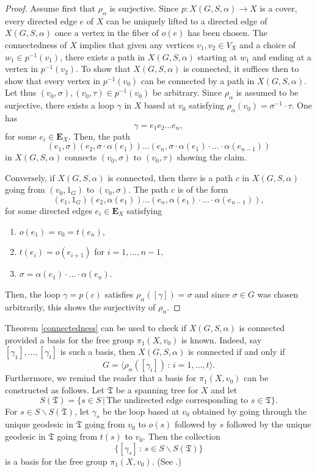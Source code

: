 \documentclass[11pt]{amsart}
\numberwithin{equation}{section}
\theoremstyle{remark}
\begin{document}
\begin{proof}
Assume first that $\rho_{\alpha}$ is surjective.  Since $p:X(G,S,\alpha) \rightarrow X$ is a cover, every directed edge $e$ of $X$ can be uniquely lifted to a directed edge of $X(G,S,\alpha)$ once a vertex in the fiber of $o(e)$ has been chosen.  The connectedness of $X$ implies that given any vertices $v_{1}, v_{2} \in V_{X}$ and a choice of $w_{1} \in p^{-1}(v_{1})$, there exists a path in $X(G,S,\alpha)$ starting at $w_{1}$ and ending at a vertex in $p^{-1}(v_{2})$.  To show that $X(G,S,\alpha)$ is connected, it suffices then to show that every vertex in $p^{-1}(v_{0})$ can be connected by a path in $X(G,S,\alpha)$.  Let thus $(v_{0},\sigma), (v_{0},\tau) \in p^{-1}(v_{0})$ be arbitrary.  Since $\rho_{\alpha}$ is assumed to be surjective, there exists a loop $\gamma$ in $X$ based at $v_{0}$ satisfying $\rho_{\alpha}(v_{0}) = \sigma^{-1} \cdot \tau$.  One has
$$\gamma = e_{1}e_{2} \ldots e_{n}, $$
for some $e_{i} \in \mathbf{E}_{X}$.  Then, the path
$$(e_{1},\sigma)(e_{2},\sigma \cdot \alpha(e_{1}))\ldots(e_{n},\sigma \cdot \alpha(e_{1}) \cdot \ldots \cdot \alpha(e_{n-1})) $$
in $X(G,S,\alpha)$ connects $(v_{0},\sigma)$ to $(v_{0},\tau)$ showing the claim.

Conversely, if $X(G,S,\alpha)$ is connected, then there is a path $c$ in $X(G,S,\alpha)$ going from $(v_{0},1_{G})$ to $(v_{0},\sigma)$.  The path $c$ is of the form
$$(e_{1},1_{G})(e_{2}, \alpha(e_{1}))\ldots(e_{n}, \alpha(e_{1}) \cdot \ldots \cdot \alpha(e_{n-1})), $$
for some directed edges $e_{i} \in \mathbf{E}_{X}$ satisfying
\begin{enumerate}
\item $o(e_{1}) = v_{0} = t(e_{n})$, 
\item $t(e_{i}) = o(e_{i+1})$ for $i=1,\ldots,n-1$,
\item $\sigma = \alpha(e_{1}) \cdot \ldots \cdot \alpha(e_{n})$.
\end{enumerate}
Then, the loop $\gamma = p(c)$ satisfies $\rho_{\alpha}([\gamma]) = \sigma$ and since $\sigma \in G$ was chosen arbitrarily, this shows the surjectivity of $\rho_{\alpha}$.
\end{proof}
Theorem \ref{connectedness} can be used to check if $X(G,S,\alpha)$ is connected provided a basis for the free group $\pi_{1}(X,v_{0})$ is known.  Indeed, say $[\gamma_{1}],\ldots,[\gamma_{t}]$ is such a basis, then $X(G,S,\alpha)$ is connected if and only if 
$$G = \langle \rho_{\alpha}([\gamma_{i}]) \, : \, i=1,\ldots,t \rangle. $$
Furthermore, we remind the reader that a basis for $\pi_{1}(X,v_{0})$ can be constructed as follows.  Let $\mathfrak{T}$ be a spanning tree for $X$ and let 
$$S(\mathfrak{T}) = \{s \in S \, | \, \text{The undirected edge corresponding to } s \in \mathfrak{T} \}.$$
For $s \in S \smallsetminus S(\mathfrak{T})$, let $\gamma_{s}$ be the loop based at $v_{0}$ obtained by going through the unique geodesic in $\mathfrak{T}$ going from $v_{0}$ to $o(s)$ followed by $s$ followed by the unique geodesic in $\mathfrak{T}$ going from $t(s)$ to $v_{0}$.  Then the collection
$$\{[\gamma_{s}] \, : \, s \in S \smallsetminus S(\mathfrak{T})\} $$
is a basis for the free group $\pi_{1}(X,v_{0})$.  (See \cite[page 68]{Sunada:2013}.)
\end{document}
